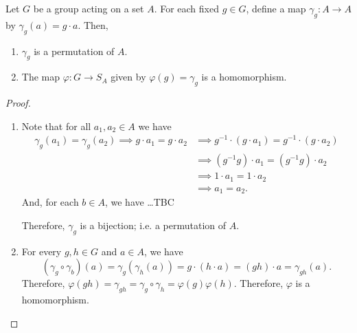 \documentclass[11pt]{penrose}
\begin{document}
\begin{nprop}
    Let $G$ be a group acting on a set $A$. For each fixed $g \in G$, define a map $\gamma_{g} : A \to A$ by $\gamma_{g}(a) = g \cdot a$. Then,
    \begin{enumerate}
        \item $\gamma_{g}$ is a permutation of $A$.
        \item The map $\varphi : G \to S_{A}$ given by $\varphi(g) = \gamma_{g}$ is a homomorphism.
    \end{enumerate}
\end{nprop}
\begin{proof}
    \phantom{.}
    \begin{enumerate}
        \item Note that for all $a_{1}, a_{2} \in A$ we have
        \begin{align*}
            \gamma_{g}(a_{1}) = \gamma_{g}(a_{2})
            \implies g \cdot a_{1} = g \cdot a_{2}
            &\implies g^{-1} \cdot (g \cdot a_{1}) = g^{-1} \cdot (g \cdot a_{2})\\
            &\implies (g^{-1}g) \cdot a_{1} = (g^{-1}g) \cdot a_{2}\\
            &\implies 1 \cdot a_{1} = 1 \cdot a_{2}\\
            &\implies a_{1} = a_{2}.
        \end{align*}
        And, for each $b \in A$, we have \dots TBC

        Therefore, $\gamma_{g}$ is a bijection; i.e. a permutation of $A$.

        \item For every $g, h \in G$ and $a \in A$, we have
        \begin{equation*}
            (\gamma_{g} \circ \gamma_{b}) (a)
            = \gamma_{g} (\gamma_{h} (a))
            = g \cdot (h \cdot a)
            = (gh) \cdot a
            = \gamma_{gh}(a).
        \end{equation*}
        Therefore, $\varphi(gh) = \gamma_{gh} = \gamma_{g} \circ \gamma_{h} = \varphi(g)\varphi(h)$. Therefore, $\varphi$ is a homomorphism.
        \qedhere
    \end{enumerate}
\end{proof}
\end{document}
